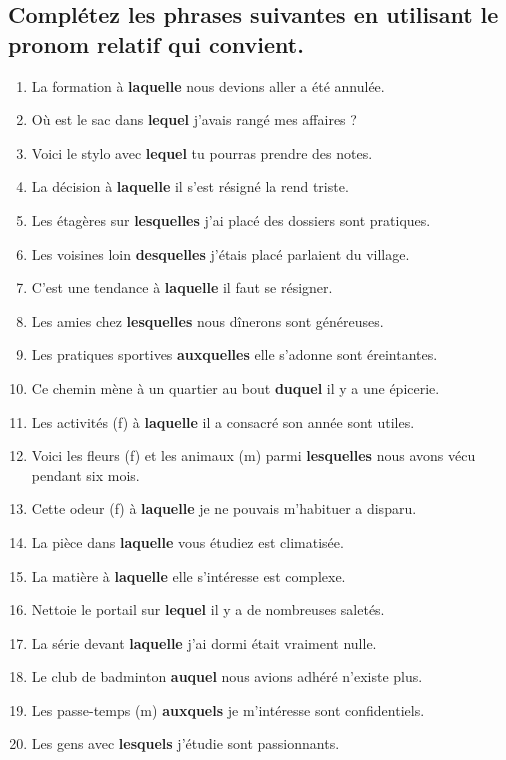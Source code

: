 \documentclass[12pt]{article}
\newcommand{\colo}[1]{{\color{blue}\textbf{#1}}}
\begin{document}
\subsection{Complétez les phrases suivantes en utilisant le pronom relatif qui convient.} 
\begin{enumerate}
\item La formation à \colo{laquelle} nous devions aller a été annulée. \item Où est le sac dans \colo{lequel} j’avais rangé mes affaires ? \item Voici le stylo avec \colo{lequel} tu pourras prendre des notes. \item La décision à \colo{laquelle} il s’est résigné la rend triste.
\item Les étagères sur \colo{lesquelles} j’ai placé des dossiers sont pratiques. 
\item Les voisines loin \colo{desquelles} j’étais placé parlaient du village. 
\item C’est une tendance à \colo{laquelle} il faut se résigner. 
\item Les amies chez \colo{lesquelles} nous dînerons sont généreuses. \item Les pratiques sportives \colo{auxquelles} elle s’adonne sont éreintantes. 
\item Ce chemin mène à un quartier au bout \colo{duquel} il y a une épicerie. 
\item Les activités (f) à \colo{laquelle} il a consacré son année sont utiles. 
\item Voici les fleurs (f) et les animaux (m) parmi \colo{lesquelles} nous avons vécu pendant six mois. 
\item Cette odeur (f) à \colo{laquelle} je ne pouvais m’habituer a disparu. 
\item La pièce dans \colo{laquelle} vous étudiez est climatisée. 
\item La matière à \colo{laquelle} elle s’intéresse est complexe. \item Nettoie le portail sur \colo{lequel} il y a de nombreuses saletés. 
\item La série devant \colo{laquelle} j’ai dormi était vraiment nulle. \item Le club de badminton \colo{auquel} nous avions adhéré n’existe plus. 
\item Les passe-temps (m) \colo{auxquels} je m’intéresse sont confidentiels. 
\item Les gens avec \colo{lesquels} j’étudie sont passionnants.
\end{enumerate}
\end{document}
